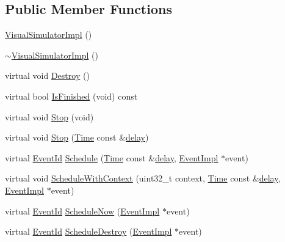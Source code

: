 \subsection*{Public Member Functions}
\begin{DoxyCompactItemize}
\item 
\hyperlink{classns3_1_1VisualSimulatorImpl_a310ae3a4e1568456b860b6f2576386b1}{Visual\+Simulator\+Impl} ()
\item 
\hyperlink{classns3_1_1VisualSimulatorImpl_a40139b3e01fa4f266eed45c0d9c4c6fa}{$\sim$\+Visual\+Simulator\+Impl} ()
\item 
virtual void \hyperlink{classns3_1_1VisualSimulatorImpl_a4805614027e11e3e4518690b2fe96272}{Destroy} ()
\item 
virtual bool \hyperlink{classns3_1_1VisualSimulatorImpl_a4e11da835c6cff78f2a303744f401446}{Is\+Finished} (void) const 
\item 
virtual void \hyperlink{classns3_1_1VisualSimulatorImpl_a53da9f74b365632f76022abb3b6b7793}{Stop} (void)
\item 
virtual void \hyperlink{classns3_1_1VisualSimulatorImpl_a5775514649d2804248339e040fe67683}{Stop} (\hyperlink{classns3_1_1Time}{Time} const \&\hyperlink{mmwave_2model_2fading-traces_2fading__trace__generator_8m_a7964e6aa8f61a9d28973c8267a606ad8}{delay})
\item 
virtual \hyperlink{classns3_1_1EventId}{Event\+Id} \hyperlink{classns3_1_1VisualSimulatorImpl_aa933ecc18bc8f8d3eec4ceda83080583}{Schedule} (\hyperlink{classns3_1_1Time}{Time} const \&\hyperlink{mmwave_2model_2fading-traces_2fading__trace__generator_8m_a7964e6aa8f61a9d28973c8267a606ad8}{delay}, \hyperlink{classns3_1_1EventImpl}{Event\+Impl} $\ast$event)
\item 
virtual void \hyperlink{classns3_1_1VisualSimulatorImpl_a6c2f9bdfaef132ceeb152132abc27c4b}{Schedule\+With\+Context} (uint32\+\_\+t context, \hyperlink{classns3_1_1Time}{Time} const \&\hyperlink{mmwave_2model_2fading-traces_2fading__trace__generator_8m_a7964e6aa8f61a9d28973c8267a606ad8}{delay}, \hyperlink{classns3_1_1EventImpl}{Event\+Impl} $\ast$event)
\item 
virtual \hyperlink{classns3_1_1EventId}{Event\+Id} \hyperlink{classns3_1_1VisualSimulatorImpl_aee9a673832778b5aaa247186cac44a7e}{Schedule\+Now} (\hyperlink{classns3_1_1EventImpl}{Event\+Impl} $\ast$event)
\item 
virtual \hyperlink{classns3_1_1EventId}{Event\+Id} \hyperlink{classns3_1_1VisualSimulatorImpl_a9c8572e0e70a489f4bf35d50a45a65d3}{Schedule\+Destroy} (\hyperlink{classns3_1_1EventImpl}{Event\+Impl} $\ast$event)

\end{DoxyCompactItemize}

